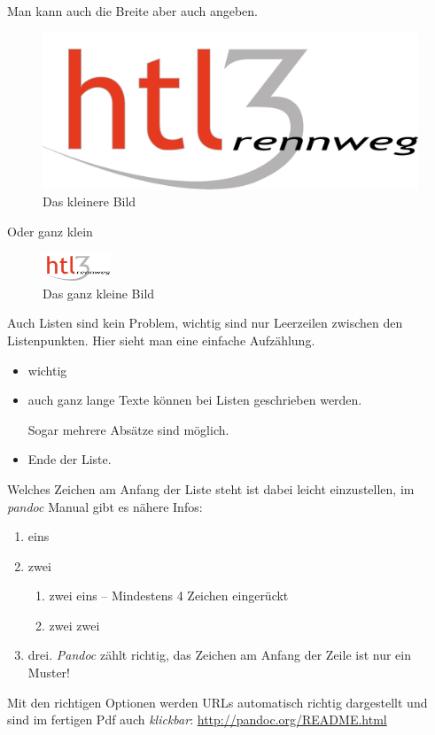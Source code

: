 Man kann auch die Breite aber auch angeben.

\begin{figure}
\centering
\includegraphics[width=12cm,height=\textheight]{HTL3RLogo.png}
\caption{Das kleinere Bild}
\end{figure}

Oder ganz klein

\begin{figure}
\centering
\includegraphics[width=2cm,height=\textheight]{HTL3RLogo.png}
\caption{Das ganz kleine Bild}
\end{figure}

Auch Listen sind kein Problem, wichtig sind nur Leerzeilen zwischen den
Listenpunkten. Hier sieht man eine einfache Aufzählung.

\begin{itemize}
\item
  wichtig
\item
  auch ganz lange Texte können bei Listen geschrieben werden.

  Sogar mehrere Absätze sind möglich.
\item
  Ende der Liste.
\end{itemize}

Welches Zeichen am Anfang der Liste steht ist dabei leicht einzustellen,
im \emph{pandoc} Manual gibt es nähere Infos:

\begin{enumerate}
\def\labelenumi{\arabic{enumi}.}
\item
  eins
\item
  zwei

  \begin{enumerate}
  \def\labelenumii{\roman{enumii}.}
  \tightlist
  \item
    zwei eins -- Mindestens 4 Zeichen eingerückt
  \item
    zwei zwei
  \end{enumerate}
\item
  drei. \emph{Pandoc} zählt richtig, das Zeichen am Anfang der Zeile ist
  nur ein Muster!
\end{enumerate}

Mit den richtigen Optionen werden URLs automatisch richtig dargestellt
und sind im fertigen Pdf auch \emph{klickbar}:
\url{http://pandoc.org/README.html}
